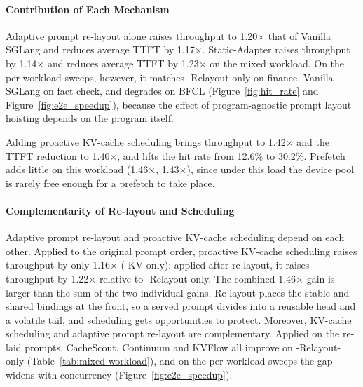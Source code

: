 \paragraph{Contribution of Each Mechanism}
Adaptive prompt re-layout alone raises throughput to 1.20$\times$ that of Vanilla SGLang and reduces average TTFT by 1.17$\times$.
Static-Adapter raises throughput by 1.14$\times$ and reduces average TTFT by 1.23$\times$ on the mixed workload. On the per-workload sweeps, however, it matches \sysname-Relayout-only on finance, Vanilla SGLang on fact check, and degrades on BFCL (Figure~\ref{fig:hit_rate} and Figure~\ref{fig:e2e_speedup}), because the effect of program-agnostic prompt layout hoisting depends on the program itself.

Adding proactive KV-cache scheduling brings throughput to 1.42$\times$ and the TTFT reduction to 1.40$\times$, and lifts the hit rate from 12.6\% to 30.2\%. Prefetch adds little on this workload (1.46$\times$, 1.43$\times$), since under this load the device pool is rarely free enough for a prefetch to take place.

\paragraph{Complementarity of Re-layout and Scheduling}
Adaptive prompt re-layout and proactive KV-cache scheduling depend on each other. Applied to the original prompt order, proactive KV-cache scheduling raises throughput by only 1.16$\times$ (\sysname-KV-only); applied after re-layout, it raises throughput by 1.22$\times$ relative to \sysname-Relayout-only. The combined 1.46$\times$ gain is larger than the sum of the two individual gains. Re-layout places the stable and shared bindings at the front, so a served prompt divides into a reusable head and a volatile tail, and scheduling gets opportunities to protect. Moreover, KV-cache scheduling and adaptive prompt re-layout are complementary. Applied on the re-laid prompts, CacheScout, Continuum and KVFlow all improve on \sysname-Relayout-only (Table~\ref{tab:mixed-workload}), and on the per-workload sweeps the gap widens with concurrency (Figure~\ref{fig:e2e_speedup}). 
